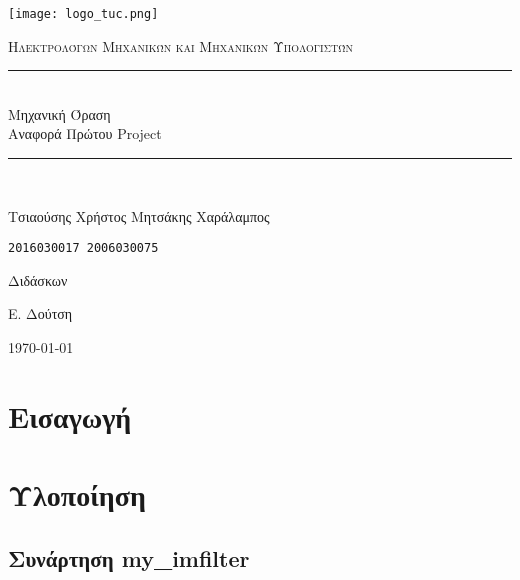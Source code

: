 \documentclass[11pt]{scrartcl} %
\begin{document}
\begin{titlepage}
    \centering
    \texttt{[image: logo\_tuc.png]}\par\vspace{1cm}
    \normalfont\normalsize
    \textsc{\textcolor[rgb]{0.66, 0.09, 0.19}{Ηλεκτρολόγων Μηχανικών και Μηχανικών Υπολογιστών}}\\ %
    \vspace{25pt} %
    \rule{\linewidth}{0.5pt}\\ %
    \vspace{20pt} %
    {\Huge Μηχανική Όραση}\\ %

    {\huge Αναφορά Πρώτου Project}\\ %
    \vspace{12pt} %
    \rule{\linewidth}{2pt}\\ %
    \vspace{12pt} %
    \vspace{2cm}

    {\LARGE{Τσιαούσης Χρήστος \hfill Μητσάκης Χαράλαμπος}
        \par
        \texttt{2016030017 \hfill 2006030075}
        \par
    }

    \vfill
    Διδάσκων

    Ε. Δούτση

    \vfill

    {\large \today\par}
\end{titlepage}

\newpage
\tableofcontents


\section{Εισαγωγή}

\section{Υλοποίηση}

\subsection{Συνάρτηση my\_imfilter}
\end{document}
